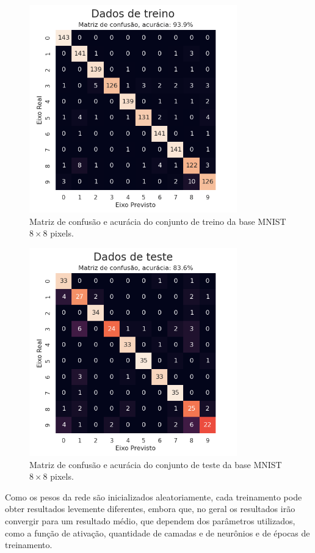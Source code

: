\begin{figure}[htb]
\centering
\includegraphics[width=9cm]{figuras/mnist_treino}
\caption{Matriz de confusão e acurácia do conjunto de treino da base MNIST ${8\times8}$ pixels.}
\label{fig:mnist_treino}
\end{figure}

\begin{figure}[htb]
\centering
\includegraphics[width=9cm]{figuras/mnist_test}
\caption{Matriz de confusão e acurácia do conjunto de teste da base MNIST ${8\times8}$ pixels.}
\label{fig:mnist_test}
\end{figure}

Como os pesos da rede são inicializados aleatoriamente, cada treinamento pode obter resultados levemente diferentes, embora que, no geral os resultados irão convergir para um resultado médio, que dependem dos parâmetros utilizados, como a função de ativação, quantidade de camadas e de neurônios e de épocas de treinamento.

